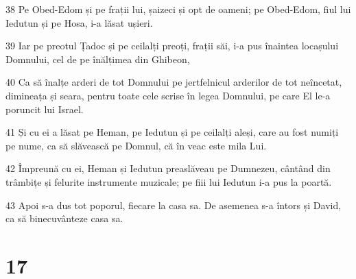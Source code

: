 \par 38 Pe Obed-Edom și pe frații lui, șaizeci și opt de oameni; pe Obed-Edom, fiul lui Iedutun și pe Hosa, i-a lăsat ușieri.
\par 39 Iar pe preotul Țadoc și pe ceilalți preoți, frații săi, i-a pus înaintea locașului Domnului, cel de pe înălțimea din Ghibeon,
\par 40 Ca să înalțe arderi de tot Domnului pe jertfelnicul arderilor de tot neîncetat, dimineața și seara, pentru toate cele scrise în legea Domnului, pe care El le-a poruncit lui Israel.
\par 41 Și cu ei a lăsat pe Heman, pe Iedutun și pe ceilalți aleși, care au fost numiți pe nume, ca să slăvească pe Domnul, că în veac este mila Lui.
\par 42 Împreună cu ei, Heman și Iedutun preaslăveau pe Dumnezeu, cântând din trâmbițe și felurite instrumente muzicale; pe fiii lui Iedutun i-a pus la poartă.
\par 43 Apoi s-a dus tot poporul, fiecare la casa sa. De asemenea s-a întors și David, ca să binecuvânteze casa sa.

\chapter{17}


